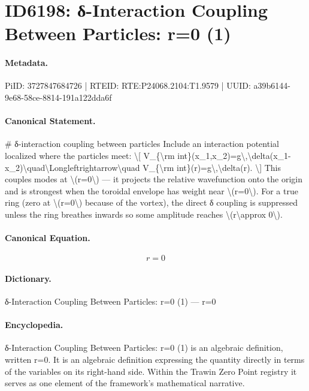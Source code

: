 \section*{ID6198: δ-Interaction Coupling Between Particles: r=0 (1)}
\paragraph{Metadata.}
PiID: 3727847684726 | RTEID: RTE:P24068.2104:T1.9579 | UUID: a39b6144-9e68-58ce-8814-191a122dda6f

\paragraph{Canonical Statement.}
\# δ-interaction coupling between particles Include an interaction potential localized where the particles meet: \textbackslash{}[ V\_\{\textbackslash{}rm int\}(x\_1,x\_2)=g\textbackslash{},\textbackslash{}delta(x\_1-x\_2)\textbackslash{}quad\textbackslash{}Longleftrightarrow\textbackslash{}quad V\_\{\textbackslash{}rm int\}(r)=g\textbackslash{},\textbackslash{}delta(r). \textbackslash{}] This couples modes at \textbackslash{}(r=0\textbackslash{}) — it projects the relative wavefunction onto the origin and is strongest when the toroidal envelope has weight near \textbackslash{}(r=0\textbackslash{}). For a true ring (zero at \textbackslash{}(r=0\textbackslash{}) because of the vortex), the direct δ coupling is suppressed unless the ring breathes inwards so some amplitude reaches \textbackslash{}(r\textbackslash{}approx 0\textbackslash{}).

\paragraph{Canonical Equation.}
\[
r=0
\]

\paragraph{Dictionary.}
δ-Interaction Coupling Between Particles: r=0 (1) — r=0

\paragraph{Encyclopedia.}
δ-Interaction Coupling Between Particles: r=0 (1) is an algebraic definition, written r=0. It is an algebraic definition expressing the quantity directly in terms of the variables on its right-hand side. Within the Trawin Zero Point registry it serves as one element of the framework's mathematical narrative.
